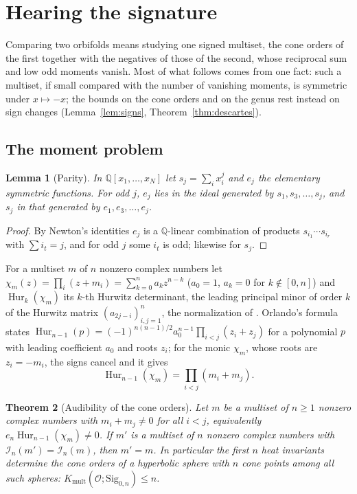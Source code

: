 \documentclass[pdflatex,sn-mathphys-num]{sn-jnl}
\theoremstyle{thmstyleone}%
\newtheorem{theorem}{Theorem}[section]%
\newtheorem{lemma}[theorem]{Lemma}%
\theoremstyle{thmstylethree}%
\newcommand{\Orb}{\mathcal{O}}
\newcommand{\Sig}{\mathrm{Sig}}
\newcommand{\Kmult}{K_{\mathrm{mult}}}
\newcommand{\cI}{\mathcal{I}}
\newcommand{\Hur}{\operatorname{Hur}}
\newcommand{\Q}{\mathbb{Q}}
\begin{document}
\section{Hearing the signature}\label{sec:signature}

Comparing two orbifolds means studying one signed multiset, the cone orders of the first together with the negatives of those of the second, whose reciprocal sum and low odd moments vanish. Most of what follows comes from one fact: such a multiset, if small compared with the number of vanishing moments, is symmetric under $x\mapsto-x$; the bounds on the cone orders and on the genus rest instead on sign changes (Lemma~\ref{lem:signs}, Theorem~\ref{thm:descartes}).

\subsection{The moment problem}

\begin{lemma}[Parity]\label{lem:parity}
In $\Q[x_1,\dots,x_N]$ let $s_j=\sum_ix_i^j$ and $e_j$ the elementary symmetric functions. For odd $j$, $e_j$ lies in the ideal generated by $s_1,s_3,\dots,s_j$, and $s_j$ in that generated by $e_1,e_3,\dots,e_j$.
\end{lemma}

\begin{proof}
By Newton's identities $e_j$ is a $\Q$-linear combination of products $s_{i_1}\cdots s_{i_r}$ with $\sum i_t=j$, and for odd $j$ some $i_t$ is odd; likewise for $s_j$.
\end{proof}

For a multiset $m$ of $n$ nonzero complex numbers let $\chi_m(z)=\prod_i(z+m_i)=\sum_{k=0}^na_kz^{n-k}$ ($a_0=1$, $a_k=0$ for $k\notin[0,n]$) and $\Hur_k(\chi_m)$ its $k$-th Hurwitz determinant, the leading principal minor of order $k$ of the Hurwitz matrix $(a_{2j-i})_{i,j=1}^n$, the normalization of \cite[(1.37)]{holtztyaglov2012}. Orlando's formula \cite[Thm~1.17]{holtztyaglov2012} states $\Hur_{n-1}(p)=(-1)^{n(n-1)/2}a_0^{n-1}\prod_{i<j}(z_i+z_j)$ for a polynomial $p$ with leading coefficient $a_0$ and roots $z_i$; for the monic $\chi_m$, whose roots are $z_i=-m_i$, the signs cancel and it gives
\begin{equation}\label{eq:orlando}
  \Hur_{n-1}(\chi_m)=\prod_{i<j}(m_i+m_j).
\end{equation}

\begin{theorem}[Audibility of the cone orders]\label{thmA}
Let $m$ be a multiset of $n\ge1$ nonzero complex numbers with $m_i+m_j\ne0$ for all $i<j$, equivalently $e_n\Hur_{n-1}(\chi_m)\ne0$. If $m'$ is a multiset of $n$ nonzero complex numbers with $\cI_n(m')=\cI_n(m)$, then $m'=m$. In particular the first $n$ heat invariants determine the cone orders of a hyperbolic sphere with $n$ cone points among all such spheres: $\Kmult(\Orb;\Sig_{0,n})\le n$.
\end{theorem}
\end{document}
